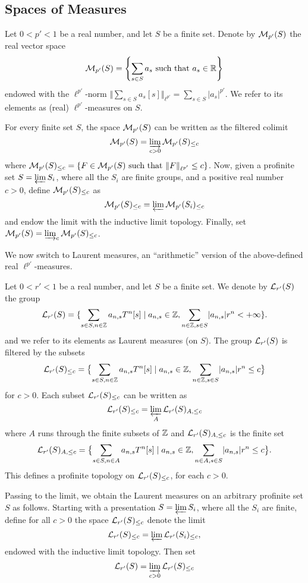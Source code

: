 \subsection{Spaces of Measures}

\begin{definition}
  \label{real-measures}
  \leanok
  Let $0 < p' < 1$ be a real number, and let $S$ be a finite set.
  Denote by $\mathcal M_{p'}(S)$ the real vector space
\[
\mathcal M_{p'}(S)=\left\{\sum_{s\in S}a_{s} \text{ such that } a_{s}\in \mathbb{R}\right\}
\]
endowed with the $\ell^{p'}$-norm $\Vert \sum_{s\in S}a_s[s]\Vert_{\ell^{p'}}=\sum_{s\in S}\lvert a_s\rvert ^{p'}$. We refer to its elements as (real) $\ell^{p'}$-measures on $S$.
\end{definition}
For every finite set $S$, the space $\mathcal M_{p'}(S)$ can be written as the filtered colimit
\[
\mathcal M_{p'}(S)=\varinjlim_{c>0}\mathcal M_{p'}(S)_{\leq c}
\]
where $\mathcal M_{p'}(S)_{\leq c}=\left\{F \in \mathcal M_{p'}(S) \text{ such that } \Vert F \Vert_{\ell^{p'}}\leq c\right\}$. Now, given a profinite set $S=\varprojlim S_i$, where all the $S_i$ are finite groups, and a positive real number $c>0$, define $\mathcal M_{p'}(S)_{\leq c}$ as
\[
\mathcal M_{p'}(S)_{\leq c}=\varprojlim \mathcal M_{p'}(S_i)_{\leq c}
\]
and endow the limit with the inductive limit topology. Finally, set $\mathcal M_{p'}(S)=\varinjlim_{c}\mathcal M_{p'}(S)_{\leq c}$.

We now switch to Laurent measures, an ``arithmetic'' version of the above-defined real $\ell^{p'}$-measures.

\begin{definition}
  \label{laurent-measures-fin}
  \leanok
  Let $0 < r' < 1$ be a real number, and let $S$ be a finite set. We denote by $\mathcal L_{r'}(S)$ the group
\[
	\mathcal L_{r'}(S)=\{\sum_{s\in S,n\in \mathbb{Z}}a_{n,s}T^n[s] \mid a_{n,s}\in \mathbb{Z}, \sum_{n\in\mathbb{Z}, s\in S}\lvert a_{n,s}\rvert r^n
< + \infty\}.
\]
and we refer to its elements as Laurent measures (on $S$).
The group $\mathcal L_{r'}(S)$ is filtered by the subsets
\[
	\mathcal L_{r'}(S)_{\leq c}=\bigl\{\sum_{s\in S,n\in \mathbb{Z}}a_{n,s}T^n[s] \mid a_{n,s}\in \mathbb{Z}, \sum_{n\in\mathbb{Z}, s\in S}\lvert a_{n,s}\rvert r^n
\leq c\bigr\}
\]
for $c> 0$. Each subset $\mathcal L_{r'}(S)_{\leq c}$ can be written as
\[
\mathcal L_{r'}(S)_{\leq c}=\varprojlim_{A}\mathcal L_{r'}(S)_{A,\leq c}
\]
where $A$ runs through the finite subsets of $\mathbb{Z}$ and $\mathcal L_{r'}(S)_{A,\leq c}$ is the finite set
\[
	\mathcal L_{r'}(S)_{A,\leq c}=\bigl\{\sum_{s\in S,n\in A}a_{n,s}T^n[s] \mid a_{n,s}\in \mathbb{Z}, \sum_{n\in A, s\in S}\lvert a_{n,s}\rvert r^n\leq c\bigr\}.
\]
This defines a profinite topology on $\mathcal L_{r'}(S)_{\leq c}$, for each $c>0$.
\end{definition}
Passing to the limit, we obtain the Laurent measures on an arbitrary profinite set $S$ as follows. 
Starting with a presentation $S=\varprojlim S_i$, where all the $S_i$ are finite, define for all $c>0$ the space $\mathcal L_{r'}(S)_{\leq c}$ denote the limit
\[
\mathcal L_{r'}(S)_{\leq c}=\varprojlim\mathcal L_{r'}(S_i)_{\leq c},
\]
endowed with the inductive limit topology. Then set
\[
\mathcal L_{r'}(S)=\varinjlim_{c > 0}\mathcal L_{r'}(S)_{\leq c}
\]

